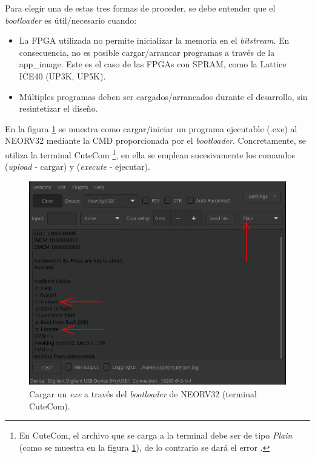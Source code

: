 Para elegir una de estas tres formas de proceder, se debe entender que el \textit{bootloader} es útil/necesario cuando:

    \begin{itemize}
        \item La FPGA utilizada no permite inicializar la memoria en el \textit{bitstream}. 
En consecuencia, no es posible cargar/arrancar programas a través de la app\_image.
Este es el caso de las FPGAs con SPRAM, como la Lattice ICE40 (UP3K, UP5K).
        \item Múltiples programas deben ser cargados/arrancados durante el desarrollo, sin resintetizar el diseño.
    \end{itemize} 

En la figura \ref{fig:boot} se muestra como cargar/iniciar un programa ejecutable (.exe) al NEORV32 mediante la CMD proporcionada por el \textit{bootloader}. 
Concretamente, se utiliza la terminal CuteCom \footnote {En CuteCom, el archivo que se carga a la terminal debe ser de tipo \textit{Plain} (como se muestra en la figura \ref{fig:boot}), de lo contrario se dará el error .}, en ella se emplean sucesivamente los comandos  (\textit{upload} - cargar) y  (\textit{execute} - ejecutar).

\begin{figure}[H]
    \centering
    \includegraphics[width=14cm]{Figuras/cutecom_cmd_upload.png}
    \caption{Cargar un \textit{exe} a través del \textit{bootloader} de NEORV32 (terminal CuteCom).}
    \label{fig:boot}
\end{figure}


